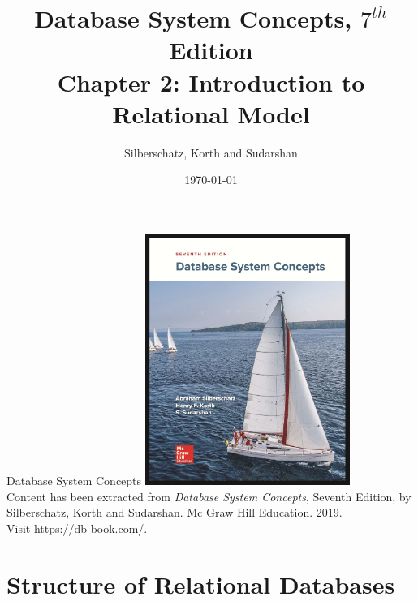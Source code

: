 \documentclass{beamer}
\title[Chapter 2]{Database System Concepts, $7^{th}$ Edition \\ Chapter 2: Introduction to Relational Model}
\author{Silberschatz, Korth and Sudarshan}
\date{\today}
\begin{document}
\frame{\titlepage}

\begin{frame}{Database System Concepts}
    \centering
    \includegraphics[width=0.5\textwidth]{figures/book_cover.jpg} \\
    \vspace{5mm}
    {
        \tiny
        Content has been extracted from \textit{Database System Concepts}, Seventh Edition, by Silberschatz, Korth and Sudarshan. Mc Graw Hill Education. 2019.\\
        Visit \url{https://db-book.com/}.\\
    }
\end{frame}

\section{Structure of Relational Databases}
\end{document}
